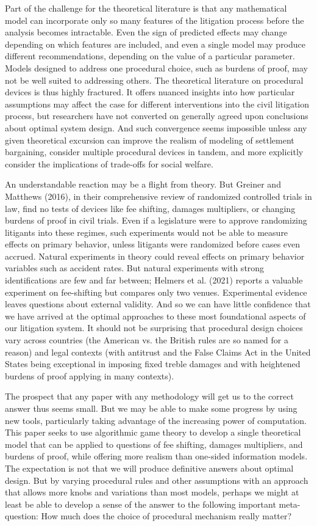 \documentclass{article}
\begin{document}
Part of the challenge for the theoretical literature is that any mathematical model can incorporate only so many features of the litigation process before the analysis becomes intractable. Even the sign of predicted effects may change depending on which features are included, and even a single model may produce different recommendations, depending on the value of a particular parameter. Models designed to address one procedural choice, such as burdens of proof, may not be well suited to addressing others. The theoretical literature on procedural devices is thus highly fractured. It offers nuanced insights into how particular assumptions may affect the case for different interventions into the civil litigation process, but researchers have not converted on generally agreed upon conclusions about optimal system design. And such convergence seems impossible unless any given theoretical excursion can improve the realism of modeling of settlement bargaining, consider multiple procedural devices in tandem, and more explicitly consider the implications of trade-offs for social welfare.

An understandable reaction may be a flight from theory. But Greiner and Matthews (2016), in their comprehensive review of randomized controlled trials in law, find no tests of devices like fee shifting, damages multipliers, or changing burdens of proof in civil trials. Even if a legislature were to approve randomizing litigants into these regimes, such experiments would not be able to measure effects on primary behavior, unless litigants were randomized before cases even accrued. Natural experiments in theory could reveal effects on primary behavior variables such as accident rates. But natural experiments with strong identifications are few and far between; Helmers et al. (2021) reports a valuable experiment on fee-shifting but compares only two venues. Experimental evidence leaves questions about external validity. And so we can have little confidence that we have arrived at the optimal approaches to these most foundational aspects of our litigation system. It should not be surprising that procedural design choices vary across countries (the American vs. the British rules are so named for a reason) and legal contexts (with antitrust and the False Claims Act in the United States being exceptional in imposing fixed treble damages and with heightened burdens of proof applying in many contexts).

The prospect that any paper with any methodology will get us to the correct answer thus seems small. But we may be able to make some progress by using new tools, particularly taking advantage of the increasing power of computation. This paper seeks to use algorithmic game theory to develop a single theoretical model that can be applied to questions of fee shifting, damages multipliers, and burdens of proof, while offering more realism than one-sided information models. The expectation is not that we will produce definitive answers about optimal design. But by varying procedural rules and other assumptions with an approach that allows more knobs and variations than most models, perhaps we might at least be able to develop a sense of the answer to the following important meta-question: How much does the choice of procedural mechanism really matter? 
\end{document}
